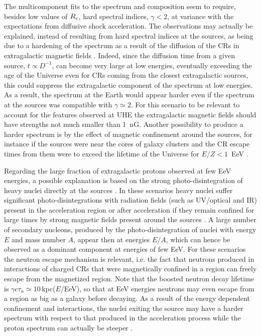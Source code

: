 \documentclass[twoside,12pt]{article}
\begin{document}
 
The multicomponent fits to the spectrum and composition seem to require, besides low values of $R_{\rm c}$, hard spectral indices, $\gamma<2$, at variance with the expectations from diffusive shock acceleration. The observations may actually be explained, instead of resulting from hard spectral indices at the sources, as being due to a hardening of the spectrum as a result of the diffusion of the CRs in extragalactic magnetic fields \cite{mo13}. Indeed, since the diffusion time from a given source, $t\propto D^{-1}$, can become very large at low energies, eventually exceeding the age of the Universe even for CRs coming from the closest extragalactic sources, this could suppress the extragalactic component of the spectrum at low energies. As a result, the spectrum at the Earth would appear harder even if the spectrum at the sources was compatible with $\gamma\simeq 2$.  For this scenario to be relevant to account for the features observed at UHE the extragalactic magnetic fields should have strengths not much smaller than 1~nG. Another possibility to produce a harder spectrum is by the effect of magnetic confinement around the sources, for instance if the sources were near the cores of  galaxy clusters and the CR escape times from them were to exceed the lifetime of the Universe for $E/Z<1$~EeV \cite{hmr16b}.

Regarding the large fraction of extragalactic protons observed at few EeV energies, a possible explanation is based on the strong photo-disintegration  of heavy nuclei directly at the sources \cite{gl15,un15}. In these scenarios heavy nuclei suffer significant photo-disintegrations with radiation fields (such as UV/optical and IR) present in the acceleration region \cite{gl15} or after acceleration if they remain confined for large times by strong magnetic fields present around the sources \cite{un15}. A large number of secondary nucleons, produced by the photo-disintegration of nuclei with energy $E$ and mass number $A$, appear then at energies $E/A$, which can hence be observed as  a dominant component at energies of few EeV. For these scenarios the neutron escape mechanism \cite{nescape} is relevant, i.e. the fact that neutrons produced in interactions of charged CRs that were magnetically confined in a region can freely escape from the magnetized region. Note that the boosted neutron decay lifetime is $\gamma c\tau_n\simeq 10$\,kpc($E$/EeV), so that at EeV energies neutrons may even escape from a region as big as a galaxy before decaying. As a result of the energy dependent confinement and interactions, the nuclei exiting the source may have a harder spectrum with respect to that produced in the acceleration process while the proton spectrum can actually be steeper \cite{gl15}.
\end{document}
